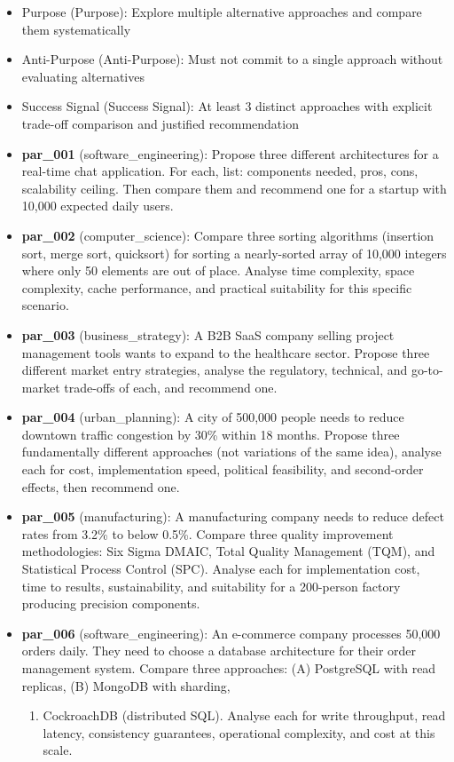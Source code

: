 \documentclass[11pt,a4paper]{article}
\providecommand{\tightlist}{%
  \setlength{\itemsep}{0pt}\setlength{\parskip}{0pt}}
\begin{document}
\begin{itemize}
\item
  Purpose (Purpose): Explore multiple alternative approaches and compare
  them systematically
\item
  Anti-Purpose (Anti-Purpose): Must not commit to a single approach
  without evaluating alternatives
\item
  Success Signal (Success Signal): At least 3 distinct approaches with
  explicit trade-off comparison and justified recommendation
\item
  \textbf{par\_001} (software\_engineering): Propose three different
  architectures for a real-time chat application. For each, list:
  components needed, pros, cons, scalability ceiling. Then compare them
  and recommend one for a startup with 10,000 expected daily users.
\item
  \textbf{par\_002} (computer\_science): Compare three sorting
  algorithms (insertion sort, merge sort, quicksort) for sorting a
  nearly-sorted array of 10,000 integers where only 50 elements are out
  of place. Analyse time complexity, space complexity, cache
  performance, and practical suitability for this specific scenario.
\item
  \textbf{par\_003} (business\_strategy): A B2B SaaS company selling
  project management tools wants to expand to the healthcare sector.
  Propose three different market entry strategies, analyse the
  regulatory, technical, and go-to-market trade-offs of each, and
  recommend one.
\item
  \textbf{par\_004} (urban\_planning): A city of 500,000 people needs to
  reduce downtown traffic congestion by 30\% within 18 months. Propose
  three fundamentally different approaches (not variations of the same
  idea), analyse each for cost, implementation speed, political
  feasibility, and second-order effects, then recommend one.
\item
  \textbf{par\_005} (manufacturing): A manufacturing company needs to
  reduce defect rates from 3.2\% to below 0.5\%. Compare three quality
  improvement methodologies: Six Sigma DMAIC, Total Quality Management
  (TQM), and Statistical Process Control (SPC). Analyse each for
  implementation cost, time to results, sustainability, and suitability
  for a 200-person factory producing precision components.
\item
  \textbf{par\_006} (software\_engineering): An e-commerce company
  processes 50,000 orders daily. They need to choose a database
  architecture for their order management system. Compare three
  approaches: (A) PostgreSQL with read replicas, (B) MongoDB with
  sharding,

  \begin{enumerate}
  \def\labelenumi{(\Alph{enumi})}
  \setcounter{enumi}{2}
  \tightlist
  \item
    CockroachDB (distributed SQL). Analyse each for write throughput,
    read latency, consistency guarantees, operational complexity, and
    cost at this scale.
  \end{enumerate}
\end{itemize}
\end{document}
